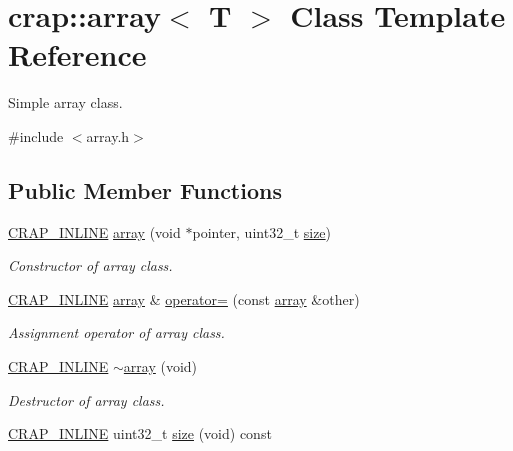 \hypertarget{classcrap_1_1array}{}\section{crap\+:\+:array$<$ T $>$ Class Template Reference}
\label{classcrap_1_1array}


Simple array class.  




{\ttfamily \#include $<$array.\+h$>$}

\subsection*{Public Member Functions}
\begin{DoxyCompactItemize}
\item 
\hyperlink{config__x86_8h_a5a40526b8d842e7ff731509998bb0f1c}{C\+R\+A\+P\+\_\+\+I\+N\+L\+I\+N\+E} \hyperlink{classcrap_1_1array_af72adceda49b018031c4fcc2cf62cfb5}{array} (void $\ast$pointer, uint32\+\_\+t \hyperlink{classcrap_1_1array_a3d91ef71204aa78a9a7bd9e7063151e8}{size})
\begin{DoxyCompactList}\small\item\em Constructor of array class. \end{DoxyCompactList}\item 
\hyperlink{config__x86_8h_a5a40526b8d842e7ff731509998bb0f1c}{C\+R\+A\+P\+\_\+\+I\+N\+L\+I\+N\+E} \hyperlink{classcrap_1_1array}{array} \& \hyperlink{classcrap_1_1array_a0af5753ce249c8c4f6e59e6521c95ca7}{operator=} (const \hyperlink{classcrap_1_1array}{array} \&other)
\begin{DoxyCompactList}\small\item\em Assignment operator of array class. \end{DoxyCompactList}\item 
\hyperlink{config__x86_8h_a5a40526b8d842e7ff731509998bb0f1c}{C\+R\+A\+P\+\_\+\+I\+N\+L\+I\+N\+E} \hyperlink{classcrap_1_1array_ad72ebb4527f76bf253557c48619f8326}{$\sim$array} (void)
\begin{DoxyCompactList}\small\item\em Destructor of array class. \end{DoxyCompactList}\item 
\hyperlink{config__x86_8h_a5a40526b8d842e7ff731509998bb0f1c}{C\+R\+A\+P\+\_\+\+I\+N\+L\+I\+N\+E} uint32\+\_\+t \hyperlink{classcrap_1_1array_a3d91ef71204aa78a9a7bd9e7063151e8}{size} (void) const 
\item 

\end{DoxyCompactItemize}
